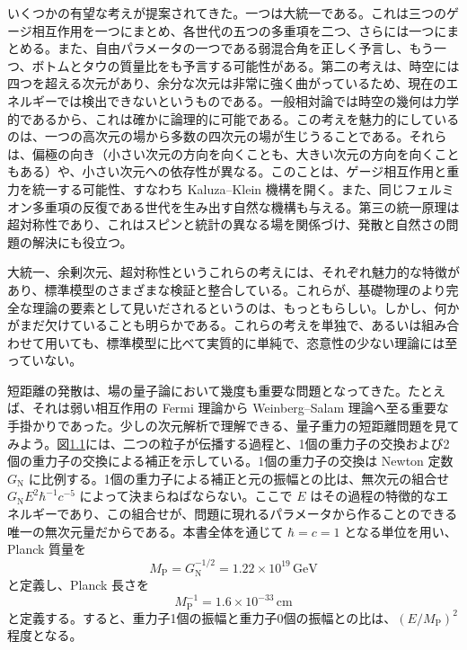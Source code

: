 いくつかの有望な考えが提案されてきた。一つは大統一である。これは三つのゲージ相互作用を一つにまとめ、各世代の五つの多重項を二つ、さらには一つにまとめる。また、自由パラメータの一つである弱混合角を正しく予言し、もう一つ、ボトムとタウの質量比をも予言する可能性がある。第二の考えは、時空には四つを超える次元があり、余分な次元は非常に強く曲がっているため、現在のエネルギーでは検出できないというものである。一般相対論では時空の幾何は力学的であるから、これは確かに論理的に可能である。この考えを魅力的にしているのは、一つの高次元の場から多数の四次元の場が生じうることである。それらは、偏極の向き（小さい次元の方向を向くことも、大きい次元の方向を向くこともある）や、小さい次元への依存性が異なる。このことは、ゲージ相互作用と重力を統一する可能性、すなわち Kaluza--Klein 機構を開く。また、同じフェルミオン多重項の反復である世代を生み出す自然な機構も与える。第三の統一原理は超対称性であり、これはスピンと統計の異なる場を関係づけ、発散と自然さの問題の解決にも役立つ。

大統一、余剰次元、超対称性というこれらの考えには、それぞれ魅力的な特徴があり、標準模型のさまざまな検証と整合している。これらが、基礎物理のより完全な理論の要素として見いだされるというのは、もっともらしい。しかし、何かがまだ欠けていることも明らかである。これらの考えを単独で、あるいは組み合わせて用いても、標準模型に比べて実質的に単純で、恣意性の少ない理論には至っていない。

短距離の発散は、場の量子論において幾度も重要な問題となってきた。たとえば、それは弱い相互作用の Fermi 理論から Weinberg--Salam 理論へ至る重要な手掛かりであった。少しの次元解析で理解できる、量子重力の短距離問題を見てみよう。図\hyperref[fig:1.1]{1.1}には、二つの粒子が伝播する過程と、1個の重力子の交換および2個の重力子の交換による補正を示している。1個の重力子の交換は Newton 定数 $G_{\mathrm N}$ に比例する。1個の重力子による補正と元の振幅との比は、無次元の組合せ $G_{\mathrm N}E^2\hbar^{-1}c^{-5}$ によって決まらねばならない。ここで $E$ はその過程の特徴的なエネルギーであり、この組合せが、問題に現れるパラメータから作ることのできる唯一の無次元量だからである。本書全体を通じて $\hbar=c=1$ となる単位を用い、Planck 質量を
\begin{equation}
M_{\mathrm P}=G_{\mathrm N}^{-1/2}=1.22\times10^{19}\,\mathrm{GeV}
\tag{1.1.1}\label{eq:1.1.1}
\end{equation}
と定義し、Planck 長さを
\begin{equation}
M_{\mathrm P}^{-1}=1.6\times10^{-33}\,\mathrm{cm}
\tag{1.1.2}\label{eq:1.1.2}
\end{equation}
と定義する。すると、重力子1個の振幅と重力子0個の振幅との比は、$(E/M_{\mathrm P})^2$ 程度となる。

